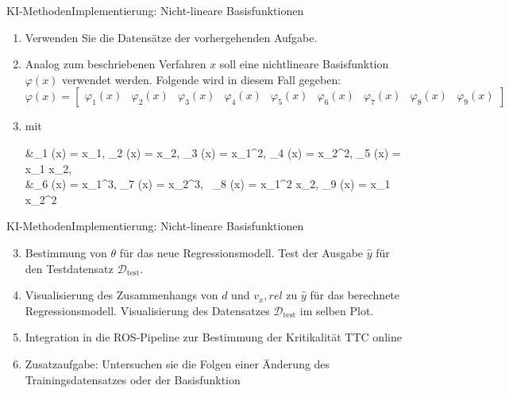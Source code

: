 \documentclass[169, handout	]{THIbeamer} %
\begin{document}
	\begin{frame}{KI-Methoden}{Implementierung: Nicht-lineare Basisfunktionen}
		\begin{enumerate}
			\item Verwenden Sie die Datensätze der vorhergehenden Aufgabe.
			\item Analog zum beschriebenen Verfahren $x$ soll eine nichtlineare Basisfunktion $\varphi (x)$ verwendet werden. Folgende wird in diesem Fall gegeben:
			\begin{equation*}
				\varphi (x) = 
				\begin{bmatrix}
					\varphi_1(x) & \varphi_2(x) & \varphi_3(x) & \varphi_4(x) & \varphi_5(x) &
					\varphi_6(x) & \varphi_7(x) & \varphi_8(x) & \varphi_9(x)
				\end{bmatrix}
			\end{equation*}
			\item[] mit
			\begin{flalign}
				&\varphi_1 (x) = x_1, \hspace{0.2 cm} \varphi_2 (x) = x_2, \hspace{0.2 cm} 						\varphi_3 (x) = x_1^2, \hspace{0.2 cm} \varphi_4 (x) = x_2^2, \hspace{0.2 cm} 
				\varphi_5 (x) = x_1 x_2, \nonumber \\
				&\varphi_6 (x) = x_1^3,\hspace{0.2 cm} \varphi_7 (x) = x_2^3,\hspace{0.2 cm} \
				\varphi_8 (x) = x_1^2 x_2, \hspace{0.2 cm}  \varphi_9 (x) = x_1 x_2^2 \nonumber
			\end{flalign}
		\end{enumerate}
	\end{frame}
	\begin{frame}{KI-Methoden}{Implementierung: Nicht-lineare Basisfunktionen}
		\begin{enumerate}
			\setcounter{enumi}{2}	
			\item Bestimmung von $\theta$ für das neue Regressionsmodell. Test der Ausgabe $\hat{y}$ für den Testdatensatz $\mathcal{D}_\text{test}$.
			\item Visualisierung des Zusammenhangs von $d$ und $v_x,rel$ zu $\hat{y}$ für das berechnete Regressionsmodell. Visualisierung des Datensatzes $\mathcal{D}_\text{test}$ im selben Plot.
			\item Integration in die ROS-Pipeline zur Bestimmung der Kritikalität TTC online
			\item Zusatzaufgabe: Untersuchen sie die Folgen einer Änderung des Trainingsdatensatzes oder der Basisfunktion
		\end{enumerate}
	\end{frame}
\end{document}
